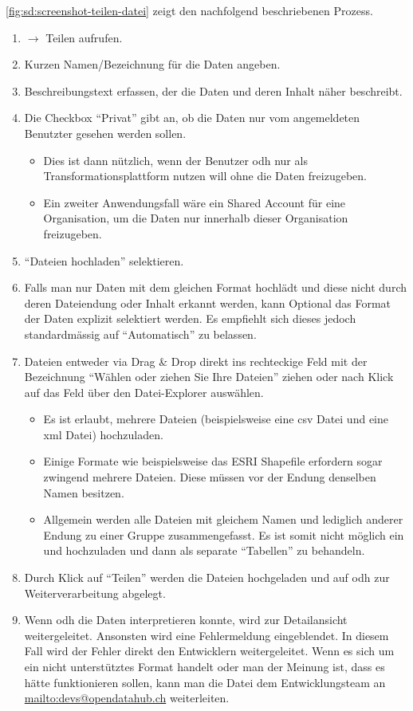 \cref{fig:sd:screenshot-teilen-datei} zeigt den nachfolgend beschriebenen Prozess.

\begin{enumerate}
\item {} $\to$ Teilen aufrufen.
\item Kurzen Namen/Bezeichnung für die Daten angeben.
\item Beschreibungstext erfassen, der die Daten und deren Inhalt näher beschreibt.
\item Die Checkbox ``Privat'' gibt an, ob die Daten nur vom angemeldeten Benutzter gesehen werden sollen.
	\begin{itemize}
	\item Dies ist dann nützlich, wenn der Benutzer \acl{odh} nur als Transformationsplattform nutzen will ohne die Daten freizugeben.
	\item Ein zweiter Anwendungsfall wäre ein Shared Account für eine Organisation, um die Daten nur innerhalb dieser Organisation freizugeben.
	\end{itemize}
\item ``Dateien hochladen'' selektieren.
\item Falls man nur Daten mit dem gleichen Format hochlädt und diese nicht durch deren Dateiendung oder Inhalt erkannt werden, kann Optional das Format der Daten explizit selektiert werden. Es empfiehlt sich dieses jedoch standardmässig auf ``Automatisch'' zu belassen.
\item Dateien entweder via Drag \& Drop direkt ins rechteckige Feld mit der Bezeichnung ``Wählen oder ziehen Sie Ihre Dateien'' ziehen oder nach Klick auf das Feld über den Datei-Explorer auswählen.
	\begin{itemize}
	\item Es ist erlaubt, mehrere Dateien (beispielsweise eine \acs{csv} Datei und eine \acs{xml} Datei) hochzuladen.
	\item Einige Formate wie beispielsweise das ESRI Shapefile erfordern sogar zwingend mehrere Dateien. Diese müssen vor der Endung denselben Namen besitzen.
	\item Allgemein werden alle Dateien mit gleichem Namen und lediglich anderer Endung zu einer Gruppe zusammengefasst. Es ist somit nicht möglich ein  und  hochzuladen und dann als separate ``Tabellen'' zu behandeln.
	\end{itemize}
\item Durch Klick auf ``Teilen'' werden die Dateien hochgeladen und auf \acl{odh} zur Weiterverarbeitung abgelegt.
\item Wenn \acl{odh} die Daten interpretieren konnte, wird zur Detailansicht weitergeleitet. Ansonsten wird eine Fehlermeldung eingeblendet. In diesem Fall wird der Fehler direkt den Entwicklern weitergeleitet. Wenn es sich um ein nicht unterstütztes Format handelt oder man der Meinung ist, dass es hätte funktionieren sollen, kann man die Datei dem Entwicklungsteam an \url{mailto:devs@opendatahub.ch} weiterleiten.
\end{enumerate}

